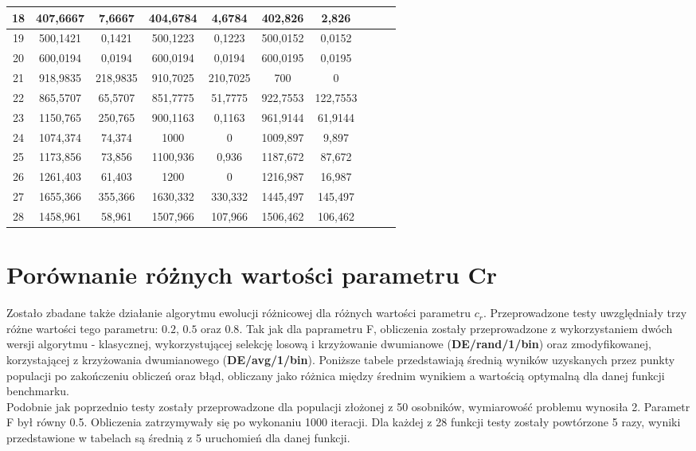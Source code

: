 \documentclass[a4paper,12pt]{article}
\theoremstyle{definition}
\begin{document}
\begin{table}[H]
\begin{tabular}{|c|c|c|c|c|c|c|c|c|c|}
    18    & 407,6667 & 7,6667 & 404,6784 & 4,6784 & 402,826 & 2,826 \\\hline
    19    & 500,1421 & 0,1421 & 500,1223 & 0,1223 & 500,0152 & 0,0152 \\\hline
    20    & 600,0194 & 0,0194 & 600,0194 & 0,0194 & 600,0195 & 0,0195 \\\hline
    21    & 918,9835 & 218,9835 & 910,7025 & 210,7025 & 700   & 0 \\\hline
    22    & 865,5707 & 65,5707 & 851,7775 & 51,7775 & 922,7553 & 122,7553 \\\hline
    23    & 1150,765 & 250,765 & 900,1163 & 0,1163 & 961,9144 & 61,9144 \\\hline
    24    & 1074,374 & 74,374 & 1000  & 0     & 1009,897 & 9,897 \\\hline
    25    & 1173,856 & 73,856 & 1100,936 & 0,936 & 1187,672 & 87,672 \\\hline
    26    & 1261,403 & 61,403 & 1200  & 0     & 1216,987 & 16,987 \\\hline
    27    & 1655,366 & 355,366 & 1630,332 & 330,332 & 1445,497 & 145,497 \\\hline
    28    & 1458,961 & 58,961 & 1507,966 & 107,966 & 1506,462 & 106,462 \\\hline
\end{tabular}	
\end{table}

\section{Porównanie różnych wartości parametru Cr}
Zostało zbadane także działanie algorytmu ewolucji różnicowej dla różnych wartości parametru $c_r$. Przeprowadzone testy uwzględniały trzy różne wartości tego parametru: $0.2$, $0.5$ oraz $0.8$. Tak jak dla paprametru F, obliczenia zostały przeprowadzone z wykorzystaniem dwóch wersji algorytmu - klasycznej, wykorzystującej selekcję losową i krzyżowanie dwumianowe (\textbf{DE/rand/1/bin}) oraz zmodyfikowanej, korzystającej z krzyżowania dwumianowego (\textbf{DE/avg/1/bin}). Poniższe tabele przedstawiają średnią wyników uzyskanych przez punkty populacji po zakończeniu obliczeń oraz błąd, obliczany jako różnica między średnim wynikiem a wartością optymalną dla danej funkcji benchmarku.\\

Podobnie jak poprzednio testy zostały przeprowadzone dla populacji złożonej z 50 osobników, wymiarowość problemu wynosiła 2. Parametr F był równy 0.5. Obliczenia zatrzymywały się po wykonaniu 1000 iteracji. Dla każdej z 28 funkcji testy zostały powtórzone 5 razy, wyniki przedstawione w tabelach są średnią z 5 uruchomień dla danej funkcji.
\end{document}
